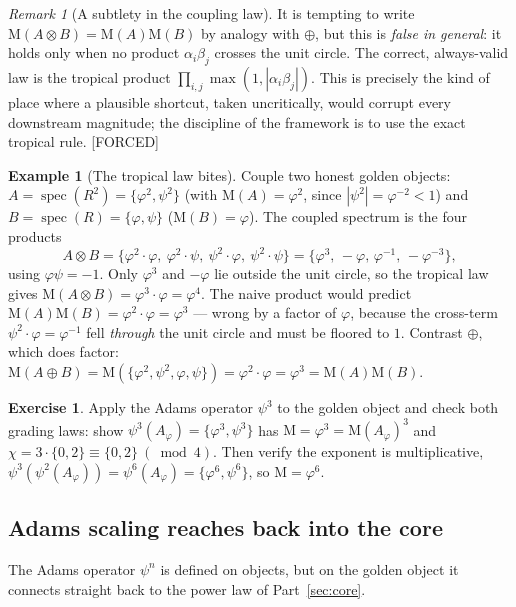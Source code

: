 \documentclass[11pt]{article}
\theoremstyle{plain}
\theoremstyle{definition}
\newtheorem{example}[theorem]{Example}
\newtheorem{exercise}[theorem]{Exercise}
\theoremstyle{remark}
\newtheorem{remark}[theorem]{Remark}
\newcommand{\Forced}{\textcolor{forcedc}{[FORCED]}}
\newcommand{\Mah}{\mathrm{M}}
\newcommand{\spec}{\operatorname{spec}}
\begin{document}
\begin{remark}[A subtlety in the coupling law]\label{rem:tropical}
It is tempting to write $\Mah(A⊗B)=\Mah(A)\Mah(B)$ by analogy with $⊕$, but this is \emph{false in general}: it holds only when no product $α_iβ_j$ crosses the unit circle. The correct, always-valid law is the tropical product $\prod_{i,j}\max(1,|α_iβ_j|)$. This is precisely the kind of place where a plausible shortcut, taken uncritically, would corrupt every downstream magnitude; the discipline of the framework is to use the exact tropical rule. \Forced
\end{remark}

\begin{example}[The tropical law bites]\label{ex:tropical}
Couple two honest golden objects: $A=\spec(R^{2})=\{φ^{2},ψ^{2}\}$ (with $\Mah(A)=φ^{2}$, since $|ψ^{2}|=φ^{-2}<1$) and $B=\spec(R)=\{φ,ψ\}$ ($\Mah(B)=φ$). The coupled spectrum is the four products
\[
A⊗B=\{φ^{2}\!\cdot\!φ,\ φ^{2}\!\cdot\!ψ,\ ψ^{2}\!\cdot\!φ,\ ψ^{2}\!\cdot\!ψ\}=\{φ^{3},\,-φ,\,φ^{-1},\,-φ^{-3}\},
\]
using $φψ=-1$. Only $φ^{3}$ and $-φ$ lie outside the unit circle, so the tropical law gives $\Mah(A⊗B)=φ^{3}\cdot φ=φ^{4}$. The naive product would predict $\Mah(A)\Mah(B)=φ^{2}\cdot φ=φ^{3}$ --- wrong by a factor of $φ$, because the cross-term $ψ^{2}\!\cdot\!φ=φ^{-1}$ fell \emph{through} the unit circle and must be floored to $1$. Contrast $⊕$, which does factor: $\Mah(A⊕B)=\Mah(\{φ^{2},ψ^{2},φ,ψ\})=φ^{2}\cdot φ=φ^{3}=\Mah(A)\Mah(B)$.
\end{example}

\begin{exercise}\label{exr:adams-grade}
Apply the Adams operator $ψ^{3}$ to the golden object and check both grading laws: show $ψ^{3}(A_φ)=\{φ^{3},ψ^{3}\}$ has $\Mah=φ^{3}=\Mah(A_φ)^{3}$ and $χ=3\cdot\{0,2\}\equiv\{0,2\}\ (\bmod4)$. Then verify the exponent is multiplicative, $ψ^{3}(ψ^{2}(A_φ))=ψ^{6}(A_φ)=\{φ^{6},ψ^{6}\}$, so $\Mah=φ^{6}$.
\end{exercise}

\subsection{Adams scaling reaches back into the core}
The Adams operator $ψ^{n}$ is defined on objects, but on the golden object it connects straight back to the power law of Part~\ref{sec:core}.
\end{document}
